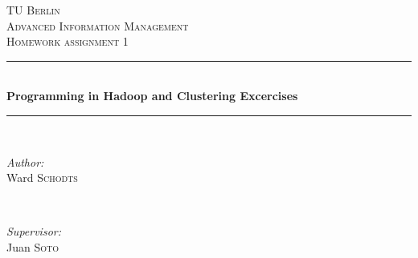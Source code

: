 \documentclass[11pt,a4paper,oneside]{article}
\begin{document}
\begin{titlepage}


\newcommand{\HRule}{\rule{\linewidth}{0.5mm}} %

\center %
 

\textsc{\textsc{\LARGE TU Berlin}}\\[1.5cm] %
\textsc{\Large Advanced Information Management}\\[0.5cm] %
\textsc{\large Homework assignment 1}\\[0.5cm] %


\HRule \\[0.4cm]
{ \huge \bfseries Programming in Hadoop and Clustering Excercises}\\[0.4cm] %
\HRule \\[1.5cm]
 

\begin{minipage}{0.4\textwidth}
\begin{flushleft} \large
\emph{Author:}\\
Ward \textsc{Schodts} %
\end{flushleft}
\end{minipage}
~
\begin{minipage}{0.4\textwidth}
\begin{flushright} \large
\emph{Supervisor:} \\
Juan \textsc{Soto} \\ %

\end{flushright}
\end{minipage}\\[4cm]


\end{titlepage}
\end{document}
